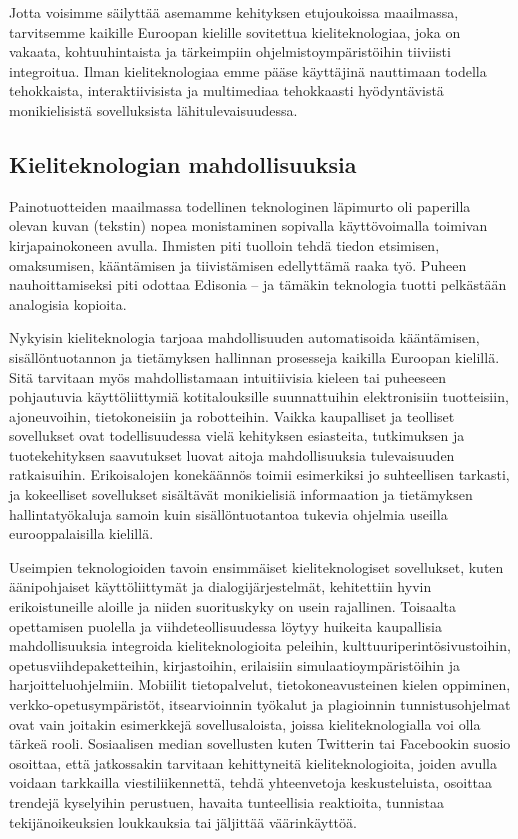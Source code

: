 \documentclass[]{../../metanetpaper}
\begin{document}
\begin{multicols}{2}
Jotta voisimme säilyttää asemamme kehityksen etujoukoissa maailmassa,
tarvitsemme kaikille Euroopan kielille sovitettua kieliteknologiaa, joka on
vakaata, kohtuuhintaista ja tärkeimpiin ohjelmistoympäristöihin tiiviisti
integroitua. Ilman kieliteknologiaa emme pääse käyttäjinä nauttimaan todella
tehokkaista, interaktiivisista ja multimediaa tehokkaasti hyödyntävistä
monikielisistä sovelluksista lähitulevaisuudessa.



\subsection{Kieliteknologian mahdollisuuksia}


Painotuotteiden maailmassa todellinen teknologinen läpimurto oli paperilla
olevan kuvan (tekstin) nopea monistaminen sopivalla käyttövoimalla toimivan
kirjapainokoneen avulla. Ihmisten piti tuolloin tehdä tiedon etsimisen,
omaksumisen, kääntämisen ja tiivistämisen edellyttämä raaka työ. Puheen
nauhoittamiseksi piti odottaa Edisonia – ja tämäkin teknologia tuotti
pelkästään analogisia kopioita.

Nykyisin kieliteknologia tarjoaa mahdollisuuden automatisoida kääntämisen,
sisällöntuotannon ja tietämyksen hallinnan prosesseja kaikilla Euroopan
kielillä. Sitä tarvitaan myös mahdollistamaan intuitiivisia kieleen tai
puheeseen pohjautuvia käyttöliittymiä kotitalouksille suunnattuihin
elektronisiin tuotteisiin, ajoneuvoihin, tietokoneisiin ja robotteihin. Vaikka
kaupalliset ja teolliset sovellukset ovat todellisuudessa vielä kehityksen
esiasteita, tutkimuksen ja tuotekehityksen saavutukset luovat aitoja
mahdollisuuksia tulevaisuuden ratkaisuihin. Erikoisalojen konekäännös toimii
esimerkiksi jo suhteellisen tarkasti, ja kokeelliset sovellukset sisältävät
monikielisiä informaation ja tietämyksen hallintatyökaluja samoin kuin
sisällöntuotantoa tukevia ohjelmia useilla eurooppalaisilla kielillä.

Useimpien teknologioiden tavoin ensimmäiset kieliteknologiset sovellukset,
kuten äänipohjaiset käyttöliittymät ja dialogijärjestelmät, kehitettiin hyvin
erikoistuneille aloille ja niiden suorituskyky on usein rajallinen. Toisaalta
opettamisen puolella ja viihdeteollisuudessa löytyy huikeita kaupallisia
mahdollisuuksia integroida kieliteknologioita peleihin,
kulttuuriperintösivustoihin, opetusviihdepaketteihin, kirjastoihin, erilaisiin 
simulaatioympäristöihin ja harjoitteluohjelmiin. Mobiilit tietopalvelut,
tietokoneavusteinen kielen oppiminen, verkko-opetusympäristöt, itsearvioinnin
työkalut ja plagioinnin tunnistusohjelmat ovat vain joitakin esimerkkejä
sovellusaloista, joissa kieliteknologialla voi olla tärkeä rooli. Sosiaalisen
median sovellusten kuten Twitterin tai Facebookin suosio osoittaa, että
jatkossakin tarvitaan kehittyneitä kieliteknologioita, joiden avulla voidaan
tarkkailla viestiliikennettä, tehdä yhteenvetoja keskusteluista, osoittaa
trendejä kyselyihin perustuen, havaita tunteellisia reaktioita, tunnistaa
tekijänoikeuksien loukkauksia tai jäljittää väärinkäyttöä.


\end{multicols}
\end{document}
